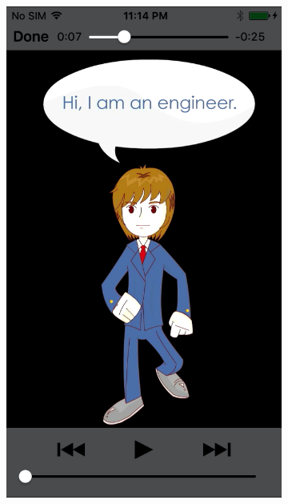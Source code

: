 \begin{figure}[H]
\begin{subfigure}{0.25\textwidth}
\includegraphics[width=\textwidth]{video2}
\caption{}
 \end{subfigure}\hspace{0.03\textwidth}
 \begin{subfigure}{0.25\textwidth}

\end{subfigure}
\end{figure}
